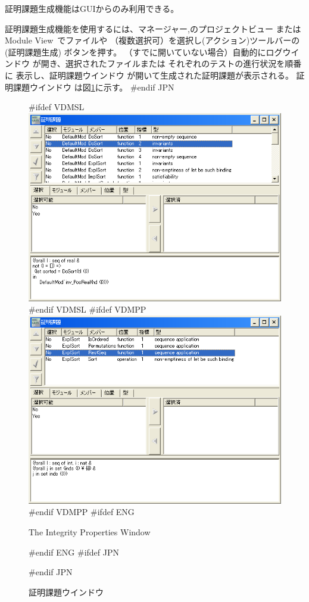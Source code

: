 \documentclass[\pformat,12pt]{article}
\newcommand{\vdmModView}{\guicmd{Module View}}
\newcommand{\vdmModView}{\guicmd{モジュールビュー}}
\newcommand{\vdmModView}{\guicmd{VDM View}}
\newcommand{\vdmModView}{\guicmd{VDMビュー}}
\newcommand{\guicmd}[1]{{\sf #1}}
\newcommand{\guicmd}[1]{{\gt #1}}
\begin{document}
証明課題生成機能はGUIからのみ利用できる。

証明課題生成機能を使用するには、\guicmd{マネージャー},の\guicmd{プロジェクトビュー} または
\vdmModView\ でファイルや
 （複数選択可）を選択し(\guicmd{アクション})ツールバーの 
(\guicmd{証明課題生成}) ボタンを押す。 （すでに開いていない場合）自動的に\guicmd{ログウインドウ} 
が開き、選択されたファイルまたは
 それぞれのテストの進行状況を順番に
表示し、\guicmd{証明課題ウインドウ} が開いて生成された証明課題が表示される。
\guicmd{証明課題ウインドウ} は図\ref{fig:integWin2}に示す。
#endif JPN

\begin{figure}[tbh]
\begin{center}
#ifdef VDMSL
\includegraphics[width=12.5cm]{integWin-sl.png}
#endif VDMSL
#ifdef VDMPP
\includegraphics[width=12.5cm]{integWin-pp.png}
#endif VDMPP
#ifdef ENG
\caption{The Integrity Properties Window}
#endif ENG
#ifdef JPN
\caption{証明課題ウインドウ}
#endif JPN
\label{fig:integWin2}
\end{center}
\end{figure}
\end{document}

